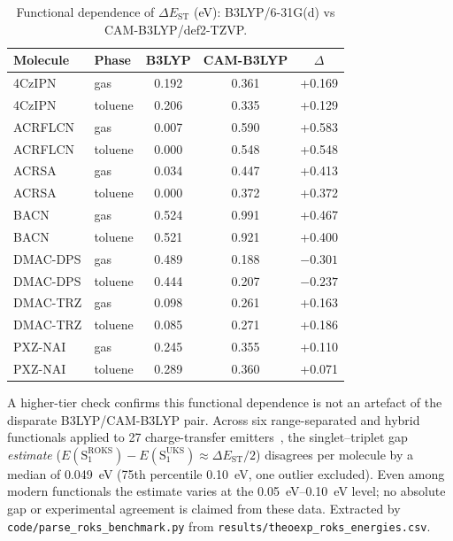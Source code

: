 \documentclass[final,3p,times,twocolumn]{elsarticle}
\begin{document}
\begin{table}[htbp]
  \centering
  \caption{Functional dependence of $\Delta E_\text{ST}$ (eV): B3LYP/6-31G(d)
    vs CAM-B3LYP/def2-TZVP.}
  \label{tab:dft_benchmark}
  \footnotesize\setlength{\tabcolsep}{3pt}
  \begin{tabular}{llccc}
    \toprule
    Molecule & Phase & B3LYP & CAM-B3LYP & $\Delta$ \\
    \midrule
    4CzIPN & gas & 0.192 & 0.361 & +0.169 \\
    4CzIPN & toluene & 0.206 & 0.335 & +0.129 \\
    ACRFLCN & gas & 0.007 & 0.590 & +0.583 \\
    ACRFLCN & toluene & 0.000 & 0.548 & +0.548 \\
    ACRSA & gas & 0.034 & 0.447 & +0.413 \\
    ACRSA & toluene & 0.000 & 0.372 & +0.372 \\
    BACN & gas & 0.524 & 0.991 & +0.467 \\
    BACN & toluene & 0.521 & 0.921 & +0.400 \\
    DMAC-DPS & gas & 0.489 & 0.188 & $-0.301$ \\
    DMAC-DPS & toluene & 0.444 & 0.207 & $-0.237$ \\
    DMAC-TRZ & gas & 0.098 & 0.261 & +0.163 \\
    DMAC-TRZ & toluene & 0.085 & 0.271 & +0.186 \\
    PXZ-NAI & gas & 0.245 & 0.355 & +0.110 \\
    PXZ-NAI & toluene & 0.289 & 0.360 & +0.071 \\
    \bottomrule
  \end{tabular}
\end{table}

A higher-tier check confirms this functional dependence is not an artefact of the
disparate B3LYP/CAM-B3LYP pair. Across six range-separated and hybrid functionals
applied to \num{27} charge-transfer emitters~\cite{Froitzheim2024}, the singlet--triplet gap \emph{estimate}
($E(\text{S}_1^\text{ROKS})-E(\text{S}_1^\text{UKS})\approx\Delta E_\text{ST}/2$)
disagrees per molecule by a median of \qty{0.049}{\electronvolt} (\num{75}th percentile
\qty{0.10}{\electronvolt}, one outlier excluded). Even among modern functionals the
estimate varies at the \qtyrange{0.05}{0.10}{\electronvolt} level; no absolute gap or
experimental agreement is claimed from these data. Extracted by
\texttt{code/parse\_roks\_benchmark.py} from \texttt{results/theoexp\_roks\_energies.csv}.
\end{document}

